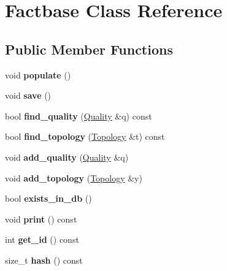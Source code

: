 \hypertarget{class_factbase}{}\section{Factbase Class Reference}
\label{class_factbase}
\subsection*{Public Member Functions}
\begin{DoxyCompactItemize}
\item 
\mbox{\label{class_factbase_ab8cee78aca6671002340a10985827f00}} 
void {\bfseries populate} ()
\item 
\mbox{\label{class_factbase_ac71444bcc117054b8b6b6db0863cdce4}} 
void {\bfseries save} ()
\item 
\mbox{\label{class_factbase_a448fd45ed66556fc226c7612b7b8cb43}} 
bool {\bfseries find\+\_\+quality} (\mbox{\hyperlink{class_quality}{Quality}} \&q) const
\item 
\mbox{\label{class_factbase_a6d602fe105005cc65a005eb59ce7eb99}} 
bool {\bfseries find\+\_\+topology} (\mbox{\hyperlink{class_topology}{Topology}} \&t) const
\item 
\mbox{\label{class_factbase_a99679712e07601eab5c127bd7b89d2ef}} 
void {\bfseries add\+\_\+quality} (\mbox{\hyperlink{class_quality}{Quality}} \&q)
\item 
\mbox{\label{class_factbase_a3b83acac4a0a1745bf443e743b4a4d56}} 
void {\bfseries add\+\_\+topology} (\mbox{\hyperlink{class_topology}{Topology}} \&y)
\item 
\mbox{\label{class_factbase_aef4739a4ad430207140ac08c70fc4296}} 
bool {\bfseries exists\+\_\+in\+\_\+db} ()
\item 
\mbox{\label{class_factbase_a084a0040a84127a2f96cf153a7074fc6}} 
void {\bfseries print} () const
\item 
\mbox{\label{class_factbase_a2ee19922db4a6260a35417d1aa4dfcc2}} 
int {\bfseries get\+\_\+id} () const
\item 
\mbox{\label{class_factbase_af88c3534ae74a4ea0f40b36ef1a48c9a}} 
size\+\_\+t {\bfseries hash} () const
\end{DoxyCompactItemize}
